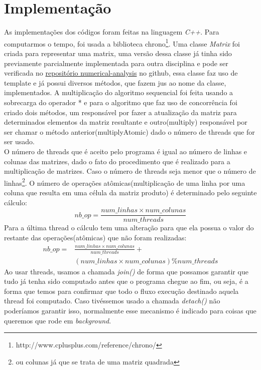 
\section{Implementação}
As implementações dos códigos foram feitas na linguagem \textit{C++}.
Para computarmos o tempo, foi usada a biblioteca chrono\footnote{http://www.cplusplus.com/reference/chrono/}. Uma classe \textit{Matrix} foi criada para representar uma matrix, uma versão dessa classe já tinha sido previamente parcialmente implementada para outra disciplina e pode ser verificada no \href{https://github.com/raquel-oliveira/numerical-analysis}{repositório numerical-analysis} no github, essa classe faz uso de template e já possui diversos métodos, que fazem jus ao nome da classe, implementados. A multiplicação do algoritmo sequencial foi feita usando a sobrecarga do operador * e para o algoritmo que faz uso de concorrência foi criado dois métodos, um responsável por fazer a atualização da matriz para determinados elementos da matriz resultante e outro(multiply) responsável por ser chamar o método anterior(multiplyAtomic) dado o número de threads que for ser usado.\\
O número de threads que é aceito pelo programa é igual ao número de linhas e colunas das matrizes, dado o fato do procedimento que é realizado para a multiplicação de matrizes. Caso o número de threads seja menor que o número de linhas\footnote{ou colunas já que se trata de uma matriz quadrada}. O número de operações atômicas(multiplicação de uma linha por uma coluna que resulta em uma célula da matriz produto) é determinado pelo seguinte cálculo:
\begin{equation*}
   nb\_op = \frac{num\_linhas \times num\_colunas}{num\_threads}
\end{equation*}
Para a última thread o cálculo tem uma alteração para que ela possua o valor do restante das operações(atômicas) que não foram realizadas:
\begin{align*}
   nb\_op = &\frac{num\_linhas \times num\_colunas}{num\_threads} +\\ &(num\_linhas \times num\_colunas) \% num\_threads
\end{align*}
Ao usar threads, usamos a chamada \textit{join()} de forma que possamos garantir que tudo já tenha sido computado antes que o programa chegue ao fim, ou seja, é a forma que temos para confirmar que todo o fluxo execução destinado aquela thread foi computado. Caso tivéssemos usado a chamada \textit{detach()} não poderíamos garantir isso, normalmente esse mecanismo é indicado para coisas que queremos que rode em \textit{background}.
\vfill
